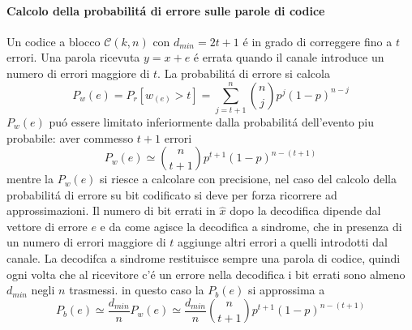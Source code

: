             \paragraph{Calcolo della probabilitá di errore sulle parole di codice}
                Un codice a blocco $\mathcal{C}(k,n)$ con $d_{min}=2t+1$ é in grado di correggere fino a $t$ errori.
                Una parola ricevuta $y=x+e$ é errata quando il canale introduce un numero di errori maggiore di $t$.
                La probabilitá di errore si calcola
                \[
                    P_w(e)= P_r[w_{(e)}>t] = \sum_{j=t+1}^{n}\binom{n}{j}p^j(1-p)^{n-j}
                \]
                $P_w(e)$ puó essere limitato inferiormente dalla probabilitá dell'evento piu probabile: aver commesso $t+1$
                errori
                \[
                    P_w(e) \simeq \binom{n}{t+1}p^{t+1}(1-p)^{n-(t+1)}
                \]
                mentre la $P_w(e)$ si riesce a calcolare con precisione, nel caso del calcolo della probabilitá di errore 
                su bit codificato si deve per forza ricorrere ad approssimazioni. Il numero di bit errati in $\hat{x}$ dopo la 
                decodifica dipende dal vettore di errore $e$ e da come agisce la decodifica a sindrome, che in presenza di un numero 
                di errori maggiore di $t$ aggiunge altri errori a quelli introdotti dal canale. La decodifca a sindrome restituisce
                sempre una parola di codice, quindi ogni volta che al ricevitore c'é un errore nella decodifica i bit errati sono almeno
                $d_{min}$ negli $n$ trasmessi. in questo caso la $P_b(e)$ si approssima a
                \[
                    P_b(e) \simeq\frac{d_{min}}{n}P_w(e)\simeq\frac{d_{min}}{n}\binom{n}{t+1}p^{t+1}(1-p)^{n-(t+1)}  
                \] 
